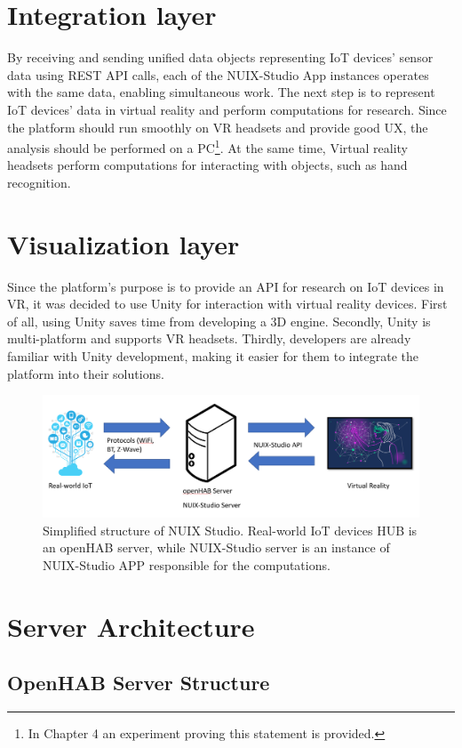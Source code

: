 \section{Integration layer}
By receiving and sending unified data objects representing IoT devices' sensor data using REST API calls, each of the NUIX-Studio App instances operates with the same data, enabling simultaneous work.
The next step is to represent IoT devices' data in virtual reality and perform computations for research. Since the platform should run smoothly on VR headsets and provide good UX, the analysis should be performed on a PC\footnote{In Chapter 4 an experiment proving this statement is provided.}. At the same time, Virtual reality headsets perform computations for interacting with objects, such as hand recognition. 

\section{Visualization layer}
Since the platform's purpose is to provide an API for research on IoT devices in VR, it was decided to use Unity for interaction with virtual reality devices. First of all, using Unity saves time from developing a 3D engine. Secondly, Unity is multi-platform and supports VR headsets. Thirdly, developers are already familiar with Unity development, making it easier for them to integrate the platform into their solutions.

\begin{figure}
  \centering
  \includegraphics[width=0.6\linewidth]{figures/BasicPlatformStructure.png}
  \caption{Simplified structure of NUIX Studio. Real-world IoT devices HUB is an openHAB server, while NUIX-Studio server is an instance of NUIX-Studio APP responsible for the computations.}
  \label{fig:BasicPlatformStructure-figure}
\end{figure}

\section{Server Architecture}
\subsection{OpenHAB Server Structure}


